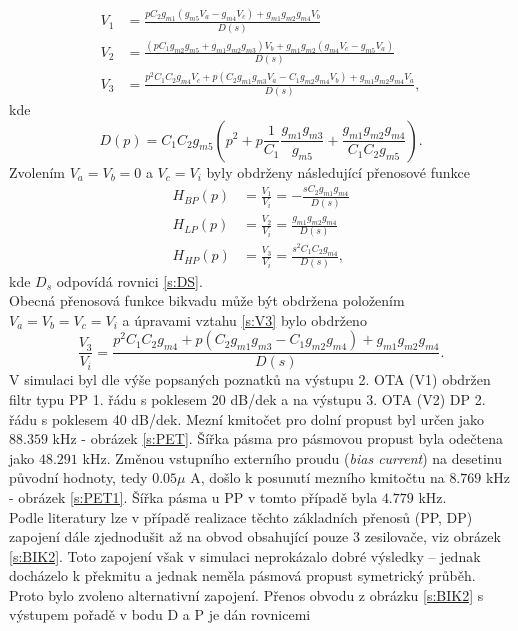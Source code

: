 \begin{align}
V_1 &= \frac{pC_2g_{m1}(g_{m5}V_a - g_{m4}V_c) + g_{m1}g_{m2}g_{m4}V_b}{D(s)}\\
V_2 &= \frac{(pC_1g_{m2}g_{m5} + g_{m1}g_{m2}g_{m3})V_b + g_{m1}g_{m2}(g_{m4}V_c - g_{m5}V_a)}{D(s)}\\
V_3 &= \frac{p^2C_1C_2g_{m4}V_c + p(C_2g_{m1}g_{m3}V_a - C_1g_{m2}g_{m4}V_b) + g_{m1}g_{m2}g_{m4}V_a}{D(s)},
\end{align}\label{s:V3}
kde
\begin{equation}
D(p) = C_1C_2g_{m5}(p^2 + p\frac{1}{C_1}\frac{g_{m1}g_{m3}}{g_{m5}} + \frac{g_{m1}g_{m2}g_{m4}}{C_1C_2g_{m5}}).
\end{equation}\label{s:DS}
\noindent Zvolením $V_a = V_b = 0$ a $V_c = V_i$ byly obdrženy následující přenosové funkce
\begin{align}
H_{BP}(p) &= \frac{V_1}{V_i} = - \frac{sC_2g_{m1}g_{m4}}{D(s)}\\
H_{LP}(p) &= \frac{V_2}{V_i} = \frac{g_{m1}g_{m2}g_{m4}}{D(s)}\\
H_{HP}(p) &= \frac{V_3}{V_i} = \frac{s^2C_1C_2g_{m4}}{D(s)},
\end{align}
kde $D_s$ odpovídá rovnici \ref{s:DS}.\\
Obecná přenosová funkce bikvadu může být obdržena položením $V_a = V_b = V_c = V_i$ a úpravami vztahu \ref{s:V3} bylo obdrženo
\begin{equation}
\frac{V_3}{V_i} = \frac{p^2C_1C_2g_{m4} + p(C_2g_{m1}g_{m3} - C_1g_{m2}g_{m4}) + g_{m1}g_{m2}g_{m4}}{D(s)}.
\end{equation}
\noindent 
V simulaci byl dle výše popsaných poznatků na výstupu 2. OTA (V1) obdržen filtr typu PP 1. řádu s poklesem 20 dB/dek a na výstupu 3. OTA (V2) DP 2. řádu s poklesem 40 dB/dek. Mezní kmitočet pro dolní propust byl určen jako $88.359$ kHz - obrázek \ref{s:PET}. Šířka pásma pro pásmovou propust byla odečtena jako $48.291$ kHz. Změnou vstupního externího proudu (\textit{bias current}) na desetinu původní hodnoty, tedy $0.05 \mu$ A, došlo k posunutí mezního kmitočtu na $8.769$ kHz - obrázek \ref{s:PET1}. Šířka pásma u PP v tomto případě byla $4.779$ kHz.\\
\noindent Podle literatury \cite{10} lze v případě realizace těchto základních přenosů (PP, DP) zapojení dále zjednodušit až na obvod obsahující pouze 3 zesilovače, viz obrázek \ref{s:BIK2}. Toto zapojení však v simulaci neprokázalo dobré výsledky -- jednak docházelo k překmitu a jednak neměla pásmová propust symetrický průběh. Proto bylo zvoleno alternativní zapojení. Přenos obvodu z obrázku \ref{s:BIK2} s výstupem pořadě v bodu D a P je dán rovnicemi
